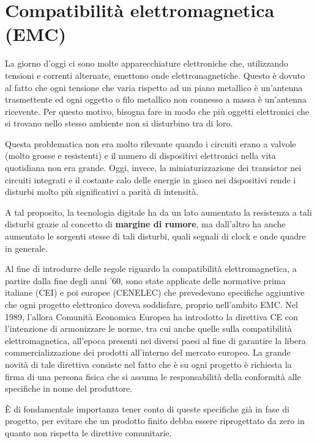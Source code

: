\documentclass[11pt,4paper]{report}
\begin{document}
\chapter{Compatibilità elettromagnetica (EMC)}
La giorno d'oggi ci sono molte apparecchiature elettroniche che, utilizzando tensioni e correnti alternate, emettono onde elettromagnetiche. Questo è dovuto al fatto che ogni tensione che varia rispetto ad un piano metallico è un'antenna trasmettente ed ogni oggetto o filo metallico non connesso a massa è un'antenna ricevente. Per questo motivo, bisogna fare in modo che più oggetti elettronici che si trovano nello stesso ambiente non si disturbino tra di loro.

Questa problematica non era molto rilevante quando i circuiti erano a valvole (molto grosse e resistenti) e il numero di dispositivi elettronici nella vita quotidiana non era grande. Oggi, invece, la miniaturizzazione dei transistor nei circuiti integrati e il costante calo delle energie in gioco nei dispositivi rende i disturbi molto più significativi a parità di intensità.

A tal proposito, la tecnologia digitale ha da un lato aumentato la resistenza a tali disturbi grazie al concetto di \textbf{margine di rumore}, ma dall'altro ha anche aumentato le sorgenti stesse di tali disturbi, quali segnali di clock e onde quadre in generale.

Al fine di introdurre delle regole riguardo la compatibilità elettromagnetica, a partire dalla fine degli anni '60, sono state applicate delle normative prima italiane (CEI) e poi europee (CENELEC) che prevedevano specifiche aggiuntive che ogni progetto elettronico doveva soddisfare, proprio nell'ambito EMC. Nel 1989, l'allora Comunità Economica Europea ha introdotto la direttiva CE con l'intenzione di armonizzare le norme, tra cui anche quelle sulla compatibilità elettromagnetica, all'epoca presenti nei diversi paesi al fine di garantire la libera commercializzazione dei prodotti all'interno del mercato europeo. La grande novità di tale direttiva consiste nel fatto che è su ogni progetto è richiesta la firma di una persona fisica che si assuma le responsabilità della conformità alle specifiche in nome del produttore.

È di fondamentale importanza tener conto di queste specifiche già in fase di progetto, per evitare che un prodotto finito debba essere riprogettato da zero in quanto non rispetta le direttive comunitarie.
\end{document}
